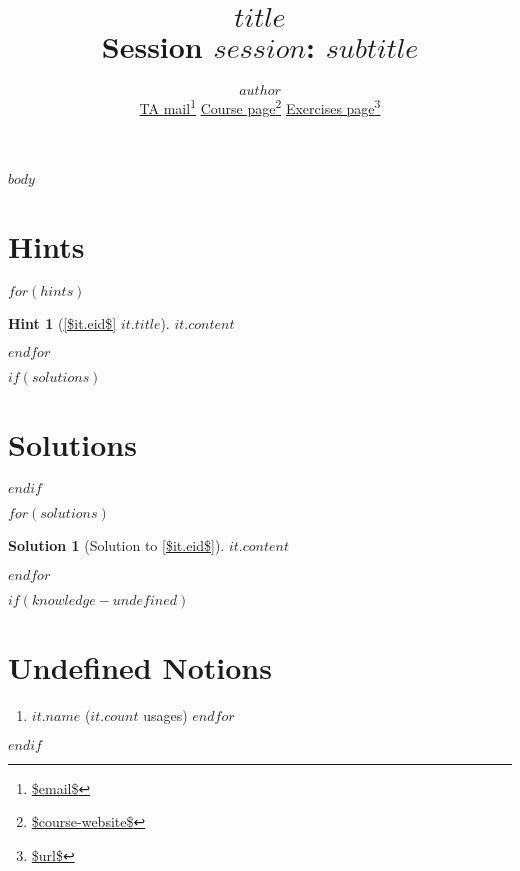 \documentclass[a4,10pt]{article}
\title{{\bfseries \Huge{$title$}} \\ Session $session$: $subtitle$}
\author{$author$ \\
        \href{mailto:$email$}{TA mail}\footnote{\url{$email$}}
        \hspace{1em}
        \href{$course-website$}{Course page}\footnote{\url{$course-website$}}
        \hspace{1em}
        \href{$url$}{Exercises page}\footnote{\url{$url$}}
}
\newtheorem{hint}{Hint}
\newtheorem{solution}{Solution}
\begin{document}
\maketitle

$body$

\printbibliography


\clearpage
\appendix

\section{Hints}

$for(hints)$
\begin{hint}[{\cref{$it.eid$} $it.title$}]
    \label{$it.id$}
    $it.content$
\end{hint}
$endfor$

$if(solutions)$
\clearpage
\section{Solutions}
$endif$

$for(solutions)$
\begin{solution}[Solution to \cref{$it.eid$}]
    \label{$it.id$}
    $it.content$
\end{solution}
$endfor$

$if(knowledge-undefined)$
\clearpage
\section{Undefined Notions}
\begin{enumerate}
$for(knowledge-undefined)$
\item \texttt{$it.name$} ($it.count$ usages)
$endfor$
\end{enumerate}
$endif$
\end{document}
